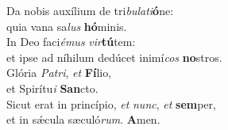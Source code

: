 \oddverse Da nobis auxílium de tri\textit{bu}\textit{la}\textit{ti}\textbf{ó}ne:~\*\\
\oddverse quia vana sa\textit{lus} \textbf{hó}minis.\\
\evenverse In Deo faci\textit{é}\textit{mus} \textit{vir}\textbf{tú}tem:~\*\\
\evenverse et ipse ad níhilum dedúcet inimí\textit{cos} \textbf{no}stros.\\
\oddverse Glória \textit{Pa}\textit{tri}, \textit{et} \textbf{Fí}lio,~\*\\
\oddverse et Spirítu\textit{i} \textbf{San}cto.\\
\evenverse Sicut erat in princípio, \textit{et} \textit{nunc}, \textit{et} \textbf{sem}per,~\*\\
\evenverse et in sǽcula sæculó\textit{rum}. \textbf{A}men.\\

